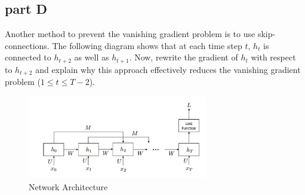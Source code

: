 \subsection{part D}
Another method to prevent the vanishing gradient problem is to use skip-connections. The following diagram shows that at each time step \( t \), \( h_t \) is connected to \( h_{t+2} \) as well as \( h_{t+1} \). Now, rewrite the gradient of \( h_t \) with respect to \( h_{t+2} \) and explain why this approach effectively reduces the vanishing gradient problem (\( 1 \leq t \leq T-2 \)).
\begin{figure}[H]
    \centering
    \includegraphics[width=0.7\textwidth]{Q3_2.png}
    \caption{Network Architecture}
\end{figure}
